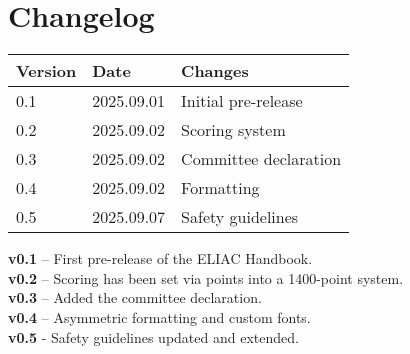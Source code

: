 
\section*{Changelog}

\begin{tabular}{lll}
\toprule
Version & Date & Changes \\ \midrule
0.1 & 2025.09.01 & Initial pre-release \\ \midrule
0.2 & 2025.09.02 & Scoring system\\ \midrule
0.3 & 2025.09.02 & Committee declaration\\ \midrule
0.4 & 2025.09.02 & Formatting\\ \midrule
0.5 & 2025.09.07 & Safety guidelines\\ \bottomrule
\end{tabular}

\vspace{1cm}

\noindent\textbf{v0.1} – First pre-release of the ELIAC Handbook.\\
\noindent\textbf{v0.2} – Scoring has been set via points into a 1400-point system.\\
\noindent\textbf{v0.3} – Added the committee declaration.\\
\noindent\textbf{v0.4} – Asymmetric formatting and custom fonts.\\
\noindent\textbf{v0.5} - Safety guidelines updated and extended.
